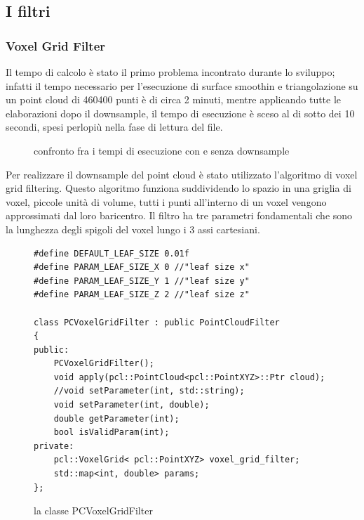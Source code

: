 \documentclass[a4paper,12pt]{article}
\begin{document}
	\subsection{I filtri}
		\subsubsection{Voxel Grid Filter}
		Il tempo di calcolo è stato il primo problema incontrato durante lo sviluppo; infatti
		il tempo necessario per l'esecuzione di surface smoothin e triangolazione su un point cloud di 460400 punti è
		di circa 2 minuti, mentre applicando tutte le elaborazioni dopo il downsample,
		il tempo di esecuzione è sceso al di sotto dei 10 secondi, spesi perlopiù nella fase di lettura del file.
		\begin{figure}[H]
    	\centering
    	\caption{confronto fra i tempi di esecuzione con e senza downsample}
    	\label{fig:time_comparison}
		\end{figure}	
		\clearpage	
		Per realizzare il downsample del point cloud è stato utilizzato l'algoritmo di voxel grid filtering.
		Questo algoritmo funziona suddividendo lo spazio in una griglia di voxel, piccole unità di volume, tutti i punti
		all'interno di un voxel vengono approssimati dal loro baricentro.
		Il filtro ha tre parametri fondamentali che sono la lunghezza degli spigoli del voxel lungo i 3 assi cartesiani.
		\begin{figure}[H]
		\begin{lstlisting}
#define DEFAULT_LEAF_SIZE 0.01f
#define PARAM_LEAF_SIZE_X 0 //"leaf size x"
#define PARAM_LEAF_SIZE_Y 1 //"leaf size y"
#define PARAM_LEAF_SIZE_Z 2 //"leaf size z"

class PCVoxelGridFilter : public PointCloudFilter
{
public:
    PCVoxelGridFilter();
    void apply(pcl::PointCloud<pcl::PointXYZ>::Ptr cloud);
    //void setParameter(int, std::string);
    void setParameter(int, double);
    double getParameter(int);
    bool isValidParam(int);
private:
    pcl::VoxelGrid< pcl::PointXYZ> voxel_grid_filter;
    std::map<int, double> params;
};
		\end{lstlisting}
		\caption{la classe PCVoxelGridFilter}
		\label{pcvoxelgridfilter}		
		\end{figure}	
\end{document}
